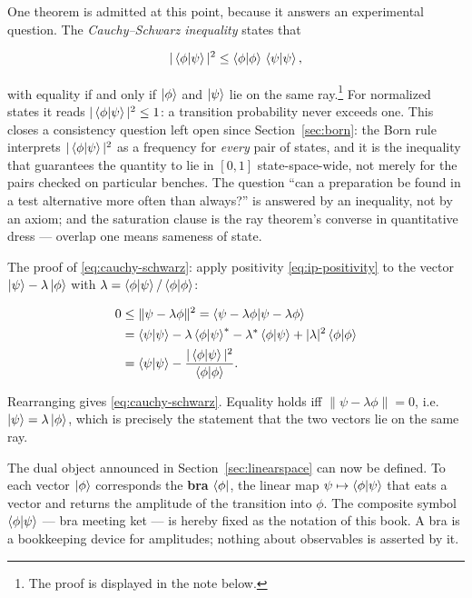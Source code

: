 One theorem is admitted at this point, because it answers an experimental question. The \emph{Cauchy--Schwarz inequality} states that
\begin{linenomath}
\begin{equation}
    |\braket{\phi|\psi}|^2
    \leq
    \braket{\phi|\phi}\,\braket{\psi|\psi},
    \label{eq:cauchy-schwarz}
\end{equation}
\end{linenomath}
with equality if and only if $\ket{\phi}$ and $\ket{\psi}$ lie on the same ray.\footnote{The proof is displayed in the note below.} For normalized states it reads $|\braket{\phi|\psi}|^2\leq 1$: a transition probability never exceeds one. This closes a consistency question left open since Section~\ref{sec:born}: the Born rule interprets $|\braket{\phi|\psi}|^2$ as a frequency for \emph{every} pair of states, and it is the inequality that guarantees the quantity to lie in $[0,1]$ state-space-wide, not merely for the pairs checked on particular benches. The question ``can a preparation be found in a test alternative more often than always?'' is answered by an inequality, not by an axiom; and the saturation clause is the ray theorem's converse in quantitative dress --- overlap one means sameness of state.

\begin{note}
The proof of \eqref{eq:cauchy-schwarz}: apply positivity \eqref{eq:ip-positivity} to the vector $\ket{\psi}-\lambda\ket{\phi}$ with $\lambda=\braket{\phi|\psi}/\braket{\phi|\phi}$:
\begin{linenomath}
\begin{align}
  0 &\le \|\psi-\lambda\phi\|^{2}
     = \braket{\psi-\lambda\phi|\psi-\lambda\phi} \nonumber\\
    &= \braket{\psi|\psi} - \lambda\braket{\phi|\psi}^{*} - \lambda^{*}\braket{\phi|\psi} + |\lambda|^{2}\braket{\phi|\phi} \nonumber\\
    &= \braket{\psi|\psi} - \frac{|\braket{\phi|\psi}|^{2}}{\braket{\phi|\phi}} .
\end{align}
\end{linenomath}
Rearranging gives \eqref{eq:cauchy-schwarz}. Equality holds iff $\|\psi-\lambda\phi\|=0$, i.e.\ $\ket{\psi}=\lambda\ket{\phi}$, which is precisely the statement that the two vectors lie on the same ray.
\end{note}

The dual object announced in Section~\ref{sec:linearspace} can now be defined. To each vector $\ket{\phi}$ corresponds the \textbf{bra} $\bra{\phi}$, the linear map $\psi\mapsto\braket{\phi|\psi}$ that eats a vector and returns the amplitude of the transition into $\phi$. The composite symbol $\braket{\phi|\psi}$ --- bra meeting ket --- is hereby fixed as the notation of this book. A bra is a bookkeeping device for amplitudes; nothing about observables is asserted by it.

